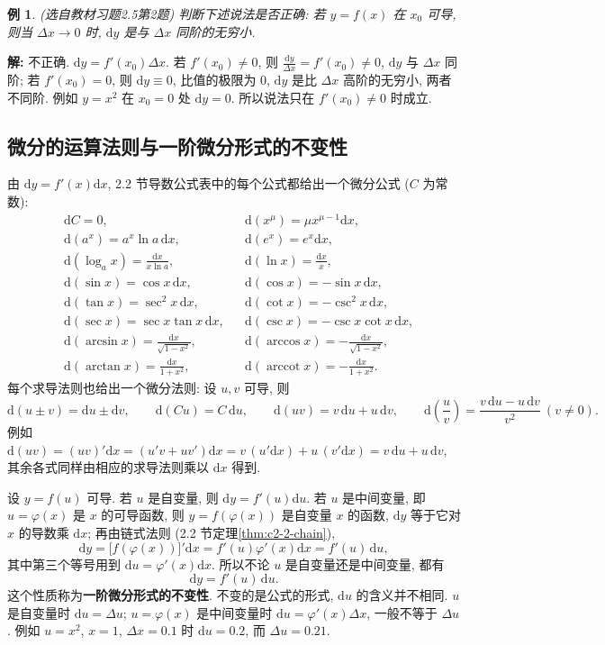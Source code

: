 \documentclass[UTF8,openany]{ctexbook}
\theoremstyle{chinesetextbook}
\newtheorem{example}{例}[section]
\newenvironment{cnsolution}{\par\indent\textbf{解:} \ignorespaces}{\par}
\newcommand{\dd}{\mathrm d}
\begin{document}
\begin{example}\label{ex:c2-h5-2}
\textnormal{(选自教材习题2.5第2题)} 判断下述说法是否正确: 若 $y=f(x)$ 在 $x_0$ 可导, 则当 $\Delta x\to0$ 时, $\dd y$ 是与 $\Delta x$ 同阶的无穷小.
\end{example}
\begin{cnsolution}
不正确. $\dd y=f'(x_0)\Delta x$. 若 $f'(x_0)\ne0$, 则 $\displaystyle\frac{\dd y}{\Delta x}=f'(x_0)\ne0$, $\dd y$ 与 $\Delta x$ 同阶; 若 $f'(x_0)=0$, 则 $\dd y\equiv0$, 比值的极限为 $0$, $\dd y$ 是比 $\Delta x$ 高阶的无穷小, 两者不同阶. 例如 $y=x^2$ 在 $x_0=0$ 处 $\dd y=0$. 所以说法只在 $f'(x_0)\ne0$ 时成立.
\end{cnsolution}
\subsection{微分的运算法则与一阶微分形式的不变性}
由 $\dd y=f'(x)\dd x$, 2.2 节导数公式表中的每个公式都给出一个微分公式 ($C$ 为常数):
\[
\begin{aligned}
&\dd C=0, &&\dd(x^\mu)=\mu x^{\mu-1}\dd x,\\
&\dd(a^x)=a^x\ln a\,\dd x, &&\dd(e^x)=e^x\dd x,\\
&\dd(\log_ax)=\frac{\dd x}{x\ln a}, &&\dd(\ln x)=\frac{\dd x}x,\\
&\dd(\sin x)=\cos x\,\dd x, &&\dd(\cos x)=-\sin x\,\dd x,\\
&\dd(\tan x)=\sec^2x\,\dd x, &&\dd(\cot x)=-\csc^2x\,\dd x,\\
&\dd(\sec x)=\sec x\tan x\,\dd x, &&\dd(\csc x)=-\csc x\cot x\,\dd x,\\
&\dd(\arcsin x)=\frac{\dd x}{\sqrt{1-x^2}}, &&\dd(\arccos x)=-\frac{\dd x}{\sqrt{1-x^2}},\\
&\dd(\arctan x)=\frac{\dd x}{1+x^2},\qquad &&\dd(\operatorname{arccot}x)=-\frac{\dd x}{1+x^2}.
\end{aligned}
\]
每个求导法则也给出一个微分法则: 设 $u,v$ 可导, 则
\[
\dd(u\pm v)=\dd u\pm\dd v,\qquad\dd(Cu)=C\,\dd u,\qquad\dd(uv)=v\,\dd u+u\,\dd v,\qquad\dd\left(\frac uv\right)=\frac{v\,\dd u-u\,\dd v}{v^2}\ (v\ne0).
\]
例如 $\dd(uv)=(uv)'\dd x=(u'v+uv')\dd x=v\,(u'\dd x)+u\,(v'\dd x)=v\,\dd u+u\,\dd v$, 其余各式同样由相应的求导法则乘以 $\dd x$ 得到.

设 $y=f(u)$ 可导. 若 $u$ 是自变量, 则 $\dd y=f'(u)\dd u$. 若 $u$ 是中间变量, 即 $u=\varphi(x)$ 是 $x$ 的可导函数, 则 $y=f(\varphi(x))$ 是自变量 $x$ 的函数, $\dd y$ 等于它对 $x$ 的导数乘 $\dd x$; 再由链式法则 (2.2 节定理\ref{thm:c2-2-chain}),
\[
\dd y=\bigl[f(\varphi(x))\bigr]'\dd x=f'(u)\varphi'(x)\dd x=f'(u)\,\dd u,
\]
其中第三个等号用到 $\dd u=\varphi'(x)\dd x$. 所以不论 $u$ 是自变量还是中间变量, 都有
\[
\dd y=f'(u)\,\dd u.
\]
这个性质称为\textbf{一阶微分形式的不变性}. 不变的是公式的形式, $\dd u$ 的含义并不相同. $u$ 是自变量时 $\dd u=\Delta u$; $u=\varphi(x)$ 是中间变量时 $\dd u=\varphi'(x)\Delta x$, 一般不等于 $\Delta u$. 例如 $u=x^2$, $x=1$, $\Delta x=0.1$ 时 $\dd u=0.2$, 而 $\Delta u=0.21$.
\end{document}
